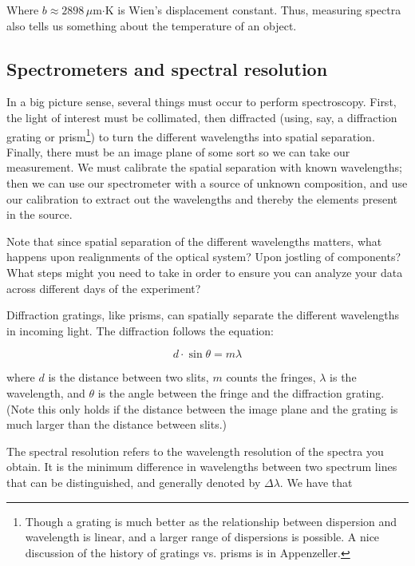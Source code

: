 \documentclass{../lab}
\begin{document}
Where $b\approx 2898\,\mu$m$\cdot$K is Wien's displacement constant. Thus, measuring spectra also tells us something about the temperature of an object.

\subsection{Spectrometers and spectral resolution}
\label{sec:spectrograph}

In a big picture sense, several things must occur to perform spectroscopy. First, the light of interest must be collimated, then diffracted (using, say, a diffraction grating or prism\footnote{Though a grating is much better as the relationship between dispersion and wavelength is linear, and a larger range of dispersions is possible. A nice discussion of the history of gratings vs. prisms is in Appenzeller.}) to turn the different wavelengths into spatial separation. Finally, there must be an image plane of some sort so we can take our measurement. We must calibrate the spatial separation with known wavelengths; then we can use our spectrometer with a source of unknown composition, and use our calibration to extract out the wavelengths and thereby the elements present in the source.

Note that since spatial separation of the different wavelengths matters, what happens upon realignments of the optical system? Upon jostling of components? What steps might you need to take in order to ensure you can analyze your data across different days of the experiment?

Diffraction gratings, like prisms, can spatially separate the different wavelengths in incoming light. The diffraction follows the equation:

\begin{equation}
    d \cdot \sin\theta = m \lambda
\end{equation}

where $d$ is the distance between two slits, $m$ counts the fringes, $\lambda$ is the wavelength, and $\theta$ is the angle between the fringe and the diffraction grating. (Note this only holds if the distance between the image plane and the grating is much larger than the distance between slits.)

The spectral resolution refers to the wavelength resolution of the spectra you obtain. It is the minimum difference in wavelengths between two spectrum lines that can be distinguished, and generally denoted by $\Delta\lambda$. We have that 
\end{document}
